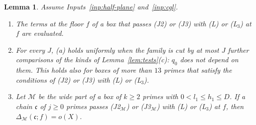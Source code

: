 \documentclass[11pt]{article}
\newtheorem{lemma}[theorem]{Lemma}
\theoremstyle{definition}
\begin{document}
\begin{lemma}\label{lem:tests3}
Assume Inputs~\ref{inp:half-plane} and~\ref{inp:cgl}.
\begin{enumerate}
\item[(a)] The terms at the floor $f$ of a box that passes (J2) or (J3) with (L) or (L$_3$) at $f$ are evaluated.
\item[(b)] For every $J$, (a) holds uniformly when the family is cut by at most $J$ further comparisons of the kinds of
  Lemma~\ref{lem:tests}(c): $q_0$ does not depend on them. This holds also for boxes of more than $13$ primes that
  satisfy the conditions of (J2) or (J3) with (L) or (L$_3$).
\item[(c)] Let $\mathcal M$ be the wide part of a box of $k \ge 2$ primes with $0 < l_1 \le h_1 \le D$. If a chain
  $\mathfrak c$ of $j \ge 0$ primes passes (J2$_{\mathcal M}$) or (J3$_{\mathcal M}$) with (L) or (L$_3$) at $f$, then
  $\Delta_{\mathcal M}(\mathfrak c; f) = o(X)$.
\end{enumerate}
\end{lemma}
\end{document}
